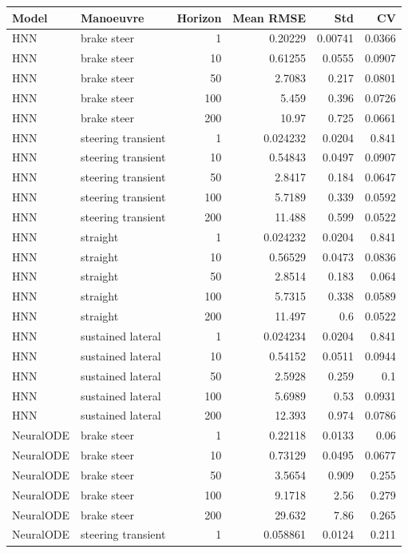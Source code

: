 \begin{tabular}{llrrrr}
\toprule
Model & Manoeuvre & Horizon & Mean RMSE & Std & CV \\ \midrule
HNN & brake steer & 1 & 0.20229 & 0.00741 & 0.0366 \\
HNN & brake steer & 10 & 0.61255 & 0.0555 & 0.0907 \\
HNN & brake steer & 50 & 2.7083 & 0.217 & 0.0801 \\
HNN & brake steer & 100 & 5.459 & 0.396 & 0.0726 \\
HNN & brake steer & 200 & 10.97 & 0.725 & 0.0661 \\
HNN & steering transient & 1 & 0.024232 & 0.0204 & 0.841 \\
HNN & steering transient & 10 & 0.54843 & 0.0497 & 0.0907 \\
HNN & steering transient & 50 & 2.8417 & 0.184 & 0.0647 \\
HNN & steering transient & 100 & 5.7189 & 0.339 & 0.0592 \\
HNN & steering transient & 200 & 11.488 & 0.599 & 0.0522 \\
HNN & straight & 1 & 0.024232 & 0.0204 & 0.841 \\
HNN & straight & 10 & 0.56529 & 0.0473 & 0.0836 \\
HNN & straight & 50 & 2.8514 & 0.183 & 0.064 \\
HNN & straight & 100 & 5.7315 & 0.338 & 0.0589 \\
HNN & straight & 200 & 11.497 & 0.6 & 0.0522 \\
HNN & sustained lateral & 1 & 0.024234 & 0.0204 & 0.841 \\
HNN & sustained lateral & 10 & 0.54152 & 0.0511 & 0.0944 \\
HNN & sustained lateral & 50 & 2.5928 & 0.259 & 0.1 \\
HNN & sustained lateral & 100 & 5.6989 & 0.53 & 0.0931 \\
HNN & sustained lateral & 200 & 12.393 & 0.974 & 0.0786 \\
NeuralODE & brake steer & 1 & 0.22118 & 0.0133 & 0.06 \\
NeuralODE & brake steer & 10 & 0.73129 & 0.0495 & 0.0677 \\
NeuralODE & brake steer & 50 & 3.5654 & 0.909 & 0.255 \\
NeuralODE & brake steer & 100 & 9.1718 & 2.56 & 0.279 \\
NeuralODE & brake steer & 200 & 29.632 & 7.86 & 0.265 \\
NeuralODE & steering transient & 1 & 0.058861 & 0.0124 & 0.211 \\

\end{tabular}
